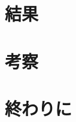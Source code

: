 \documentclass[
  b5paper,
  10pt,
  draft]{ltjsarticle}
\begin{document}
\hypertarget{ux7d50ux679c}{%
\section{結果}\label{ux7d50ux679c}}

\lipsum[1-3]

\hypertarget{ux8003ux5bdf}{%
\section{考察}\label{ux8003ux5bdf}}

\lipsum[1-3]

\hypertarget{ux7d42ux308fux308aux306b}{%
\section{終わりに}\label{ux7d42ux308fux308aux306b}}

\lipsum[5-5]


\begin{refcontext}[]{}
  \printbibliography[title={参考文献},keyword=japanese] %
\end{refcontext}

\printbibliography[title={References},notkeyword=japanese] %
\end{document}
